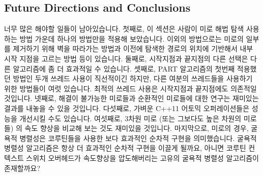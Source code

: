 \subsection{Future Directions and Conclusions}
\label{sec:SMPdesign:Future Directions and Conclusions}

너무 많은 해야할 일들이 남아있습니다.
첫째로, 이 섹션은 사람이 미로 해법 탐색 사용하는 방법 가운데 하나의 방법만을
적용해 보았습니다.
이외의 방법으로는 미로의 일부를 제거하기 위해 벽을 따라가는 방법과 이전에
탐색한 경로의 위치에 기반해서 내부 시작 지점을 고르는 방법 등이 있습니다.
둘째로, 시작지점과 끝지점의 다른 선택은 다른 알고리즘에 좀 더 효과적일 수
있습니다.
셋째로, PART 알고리즘의 첫번째 적용했던 방법인 두개 쓰레드 사용이 직선적이긴
하지만, 다른 여분의 쓰레드들을 사용하기 위한 방법들이 여럿 있습니다.
최적의 쓰레드 사용은 시작지점과 끝지점에도 의존적일 것입니다.
넷째로, 해결이 불가능한 미로들과 순환적인 미로들에 대한 연구는 재미있는 결과를
내놓을 수 있을 것입니다.
다섯째로, 가벼운 C++11 어토믹 오퍼레이션들은 성능을 개선시킬 수도 있습니다.
여섯째로, 3차원 미로 (또는 그보다도 높은 차원의 미로들) 의 속도 향상을 비교해
보는 것도 재미있을 것입니다.
마지막으로, 미로의 경우, 굴욕적 병렬성은 코루틴들을 사용한 보다 효과적인 순차적
구현을 의미했습니다.
굴욕적 병렬성 알고리즘은 항상 더 효과적인 순차적 구현을 이끌게 될까요, 아니면
코루틴 컨텍스트 스위치 오버헤드가 속도향상을 압도해버리는 고유의 굴욕적 병렬성
알고리즘이 존재할까요?


